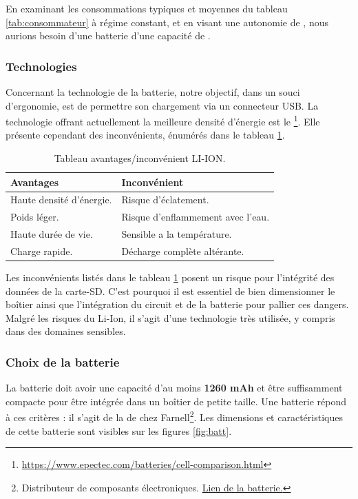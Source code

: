 En examinant les consommations typiques et moyennes du tableau \ref{tab:consommateur} à régime constant, et en visant une autonomie de , nous aurions besoin d'une batterie d'une capacité de .

\subsubsection{Technologies} Concernant la technologie de la batterie, notre objectif, dans un souci d'ergonomie, est de permettre son chargement via un connecteur USB. La technologie offrant actuellement la meilleure densité d'énergie est le \footnote{\href{https://www.epectec.com/batteries/cell-comparison.html}{https://www.epectec.com/batteries/cell-comparison.html}}. Elle présente cependant des inconvénients, énumérés dans le tableau \ref{tab:inconvlion}.

\begin{table}[h]
	\centering
	\begin{tabular}{l|l}
		Avantages &  Inconvénient\\
		\hline
		Haute densité d'énergie. & Risque d'éclatement. \\
		Poids léger. & Risque d'enflammement avec l'eau. \\ 
		Haute durée de vie. & Sensible a la température. \\
		Charge rapide. & Décharge complète altérante. \\
		\hline
	\end{tabular}
		\caption{Tableau avantages/inconvénient LI-ION.}
		\label{tab:inconvlion}
\end{table} \vspace*{-5mm}

Les inconvénients listés dans le tableau \ref{tab:inconvlion} posent un risque pour l'intégrité des données de la carte-SD. C'est pourquoi il est essentiel de bien dimensionner le boîtier ainsi que l'intégration du circuit et de la batterie pour pallier ces dangers. Malgré les risques du Li-Ion, il s'agit d'une technologie très utilisée, y compris dans des domaines sensibles.

\subsubsection{Choix de la batterie} La batterie doit avoir une capacité d'au moins \textbf{1260 mAh} et être suffisamment compacte pour être intégrée dans un boîtier de petite taille. Une batterie répond à ces critères : il s'agit de la  de chez Farnell\footnote{Distributeur de composants électroniques. \href{https://ch.farnell.com/en-CH/panasonic/picpal36/battery-li-ion-1-3ah-3-7v/dp/2819223}{Lien de la batterie.}}. Les dimensions et caractéristiques de cette batterie sont visibles sur les figures \ref{fig:batt}.

